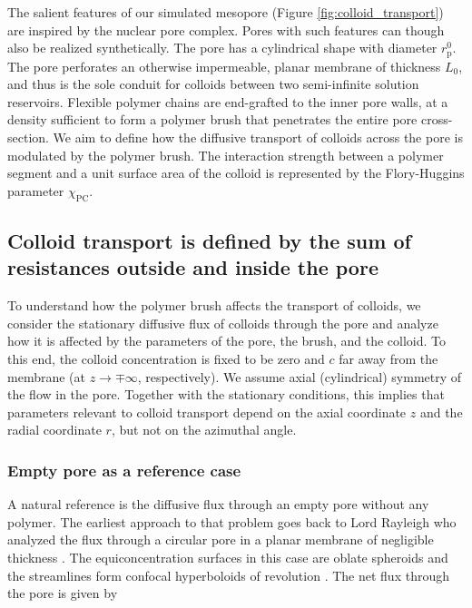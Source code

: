 \documentclass[12pt, a4paper]{article}
\begin{document}
The salient features of our simulated mesopore (Figure \ref{fig:colloid_transport}) are inspired by the nuclear pore complex.
Pores with such features can though also be realized synthetically.
The pore has a cylindrical shape with diameter $r_{\text{p}}^{0}$.
The pore perforates an otherwise impermeable, planar membrane of thickness $L_{0}$, and thus is the sole conduit for colloids between two semi-infinite solution reservoirs.
Flexible polymer chains are end-grafted to the inner pore walls, at a density sufficient to form a polymer brush that penetrates the entire pore cross-section.
We aim to define how the diffusive transport of colloids across the pore is modulated by the polymer brush. 
The interaction strength between a polymer segment and a unit surface area of the colloid is represented by the Flory-Huggins parameter $\chi_{\text{PC}}$. 


\subsection{Colloid transport is defined by the sum of resistances outside and inside the pore}

To understand how the polymer brush affects the transport of colloids, we consider the stationary diffusive flux of colloids through the pore 
and analyze how it is affected by the parameters of the pore, the brush, and the colloid.
To this end, the colloid concentration is fixed to be zero and $c$ far away from the membrane (at $z\rightarrow\mp\infty$, respectively). 
We assume axial (cylindrical) symmetry of the flow in the pore. Together with the stationary conditions, 
this implies that parameters relevant to colloid transport depend on the axial coordinate $z$ and the radial coordinate $r$, but not on the azimuthal angle.

\subsubsection{Empty pore as a reference case}

A natural reference is the diffusive flux through an empty pore without any polymer. The earliest approach to that problem goes back to Lord Rayleigh 
who analyzed the flux through a circular pore in a planar membrane of negligible thickness \cite{Strutt1878}. 
The equiconcentration surfaces in this case are oblate spheroids and the streamlines form confocal hyperboloids of revolution \cite{Cooke1966}.
The net flux through the pore is given by
\end{document}
